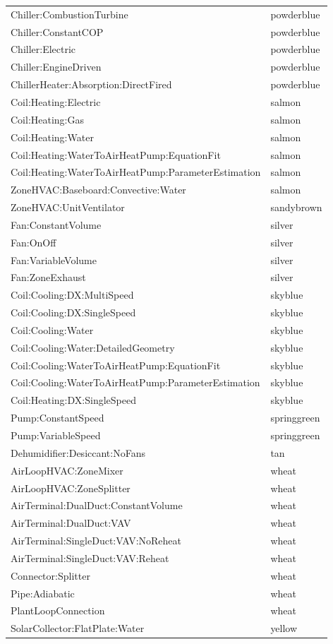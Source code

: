 \begin{longtable}[c]{@{}ll@{}}
Chiller:CombustionTurbine & powderblue \tabularnewline
Chiller:ConstantCOP & powderblue \tabularnewline
Chiller:Electric & powderblue \tabularnewline
Chiller:EngineDriven & powderblue \tabularnewline
ChillerHeater:Absorption:DirectFired & powderblue \tabularnewline
Coil:Heating:Electric & salmon \tabularnewline
Coil:Heating:Gas & salmon \tabularnewline
Coil:Heating:Water & salmon \tabularnewline
Coil:Heating:WaterToAirHeatPump:EquationFit & salmon \tabularnewline
Coil:Heating:WaterToAirHeatPump:ParameterEstimation & salmon \tabularnewline
ZoneHVAC:Baseboard:Convective:Water & salmon \tabularnewline
ZoneHVAC:UnitVentilator & sandybrown \tabularnewline
Fan:ConstantVolume & silver \tabularnewline
Fan:OnOff & silver \tabularnewline
Fan:VariableVolume & silver \tabularnewline
Fan:ZoneExhaust & silver \tabularnewline
Coil:Cooling:DX:MultiSpeed & skyblue \tabularnewline
Coil:Cooling:DX:SingleSpeed & skyblue \tabularnewline
Coil:Cooling:Water & skyblue \tabularnewline
Coil:Cooling:Water:DetailedGeometry & skyblue \tabularnewline
Coil:Cooling:WaterToAirHeatPump:EquationFit & skyblue \tabularnewline
Coil:Cooling:WaterToAirHeatPump:ParameterEstimation & skyblue \tabularnewline
Coil:Heating:DX:SingleSpeed & skyblue \tabularnewline
Pump:ConstantSpeed & springgreen \tabularnewline
Pump:VariableSpeed & springgreen \tabularnewline
Dehumidifier:Desiccant:NoFans & tan \tabularnewline
AirLoopHVAC:ZoneMixer & wheat \tabularnewline
AirLoopHVAC:ZoneSplitter & wheat \tabularnewline
AirTerminal:DualDuct:ConstantVolume & wheat \tabularnewline
AirTerminal:DualDuct:VAV & wheat \tabularnewline
AirTerminal:SingleDuct:VAV:NoReheat & wheat \tabularnewline
AirTerminal:SingleDuct:VAV:Reheat & wheat \tabularnewline
Connector:Splitter & wheat \tabularnewline
Pipe:Adiabatic & wheat \tabularnewline
PlantLoopConnection & wheat \tabularnewline
SolarCollector:FlatPlate:Water & yellow \tabularnewline
\bottomrule
\end{longtable}
